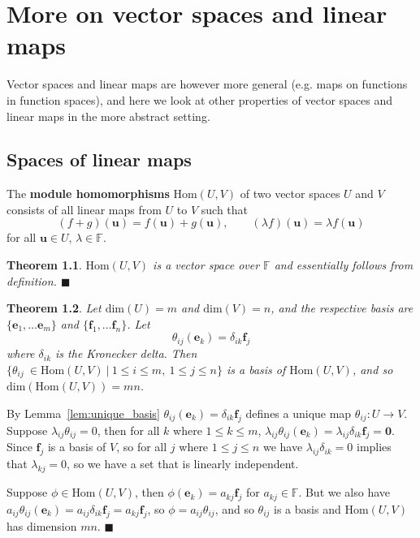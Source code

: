 \documentclass[letter-paper]{tufte-book}
\newtheorem{theorem}{\color{pastel-blue}Theorem}[section]
\newenvironment{proof}[1][Proof]{\begin{trivlist}
\item[\hskip \labelsep {\bfseries #1}]}{\end{trivlist}}
\newcommand{\Ob}{{\boldsymbol{0}}}
\newcommand{\eb}{{\boldsymbol{e}}}
\newcommand{\fb}{{\boldsymbol{f}}}
\newcommand{\ub}{{\boldsymbol{u}}}
\newcommand{\qed}{\hfill$\blacksquare$}
\begin{document}

\chapter{More on vector spaces and linear maps}

Vector spaces and linear maps are however more general (e.g. maps on functions in function spaces), and here we look at other properties of vector spaces and linear maps in the more abstract setting.


\section{Spaces of linear maps}

The \textbf{module homomorphisms} $\mbox{Hom}(U, V)$ of two vector spaces $U$ and $V$ consists of all linear maps from $U$ to $V$ such that
\begin{equation*}
  (f+g)(\ub) = f(\ub) + g(\ub), \qquad (\lambda f)(\ub) = \lambda f(\ub)
\end{equation*}
for all $\ub \in U$, $\lambda \in \mathbb{F}$.

\begin{theorem}
  $\mbox{Hom}(U,V)$ is a vector space over $\mathbb{F}$ and essentially follows from definition. \qed
\end{theorem}

\begin{theorem}\label{thm:kronecker_delta_basis}
  Let $\mbox{dim}(U) = m$ and $\mbox{dim}(V) = n$, and the respective basis are $\{\eb_1, \ldots \eb_m\}$ and $\{\fb_1, \ldots \fb_n\}$. Let
  \begin{equation*}
    \theta_{ij}(\eb_k) = \delta_{ik} \fb_j
  \end{equation*}
  where $\delta_{ik}$ is the Kronecker delta. Then $\{\theta_{ij}\ \in \mbox{Hom}(U, V)\ |\ 1\leq i\leq m,\ 1\leq j \leq n\}$ is a basis of $\mbox{Hom}(U, V)$, and so $\mbox{dim}(\mbox{Hom}(U, V)) = mn$.
\end{theorem}

\begin{proof}
  By Lemma~\ref{lem:unique_basis} $\theta_{ij}(\eb_k) = \delta_{ik}\fb_j$ defines a unique map $\theta_{ij}: U\to V$. Suppose $\lambda_{ij}\theta_{ij} = 0$, then for all $k$ where $1\leq k \leq m$, $\lambda_{ij}\theta_{ij}(\eb_k) = \lambda_{ij}\delta_{ik}\fb_j = \Ob$. Since $\fb_j$ is a basis of $V$, so for all $j$ where $1\leq j \leq n$ we have $\lambda_{ij}\delta_{ik} = 0$ implies that $\lambda_{kj} = 0$, so we have a set that is linearly independent.
  
  Suppose $\phi \in \mbox{Hom}(U, V)$, then $\phi(\eb_k) = a_{kj}\fb_{j}$ for $a_{kj}\in\mathbb{F}$. But we also have $a_{ij}\theta_{ij}(\eb_k) = a_{ij}\delta_{ik}\fb_j = a_{kj}\fb_j$, so $\phi = a_{ij}\theta_{ij}$, and so $\theta_{ij}$ is a basis and $\mbox{Hom}(U, V)$ has dimension $mn$. \qed
\end{proof}
\end{document}

